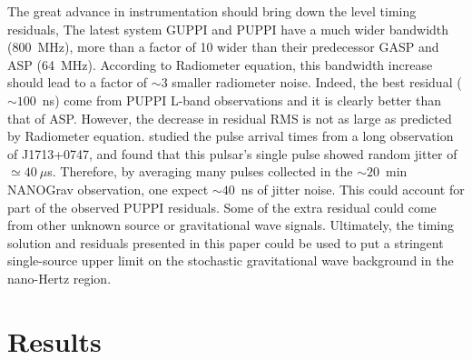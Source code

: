 The great advance in instrumentation should bring down the level timing residuals,
The latest system GUPPI and PUPPI have a much wider bandwidth (800~MHz), more than
a factor of 10 wider than their predecessor GASP and ASP (64~MHz). According to Radiometer 
equation, this bandwidth increase should lead to a factor of $\sim3$
smaller radiometer noise. 
Indeed, the best residual ($\sim100$~ns) come from PUPPI L-band observations and it is clearly better than that of ASP. However, the decrease in residual RMS is not as large as predicted by Radiometer equation.
\citet{sc12} studied the pulse arrival times from a long observation of
J1713+0747, and found that this pulsar's single pulse showed random jitter of
$\simeq40~\mu$s. Therefore, by averaging many pulses collected in the
$\sim20$~min NANOGrav observation, one expect $\sim 40$~ns of jitter noise. 
This could account for part of the observed PUPPI residuals.
Some of the extra residual could come from other unknown source or gravitational wave signals.
Ultimately, the timing solution and residuals presented in this paper could be used to put a stringent single-source upper limit on the stochastic gravitational wave background in the nano-Hertz region.



\section{Results}

